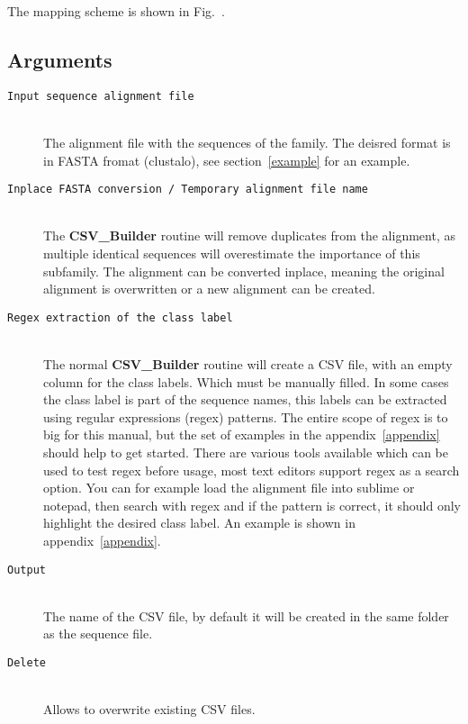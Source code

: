 \documentclass[a4paper,10pt]{article}
\begin{document}
The mapping scheme is shown in Fig.~.

\subsection{Arguments}

\begin{description}

\item[\texttt{Input sequence alignment file}] \hfill \\
 
The alignment file with the sequences of the family.
The deisred format is in FASTA fromat (clustalo), see section~\ref{example}
for an example.

\item[\texttt{Inplace FASTA conversion / Temporary alignment file name}] \hfill \\
 
The \textbf{CSV\_Builder} routine will remove duplicates from the 
alignment, as multiple identical sequences will overestimate the importance
of this subfamily. The alignment can be converted inplace, meaning
the original alignment is overwritten or a new alignment can be 
created.

\item[\texttt{Regex extraction of the class label}] \hfill \\
 
The normal \textbf{CSV\_Builder} routine will create a CSV file,
with an empty column for the class labels. Which must be manually 
filled.
In some cases the class label is part of the sequence names,
this labels can be extracted using regular expressions (regex) patterns.
The entire scope of regex is to big for this manual, but the set of
examples in the appendix~\ref{appendix} should help to get started. There are various 
tools available which can be used to test regex before usage, most text editors 
support regex as a search option. You can 
for example load the alignment file into sublime or notepad, then
search with regex and if the pattern is correct, it should only highlight 
the desired class label. An example is shown in appendix~\ref{appendix}.

\item[\texttt{Output}] \hfill \\

The name of the CSV file, by default it will be created in the same folder as
the sequence file.

\item[\texttt{Delete}] \hfill \\

Allows to overwrite existing CSV files.

\end{description}
\end{document}

